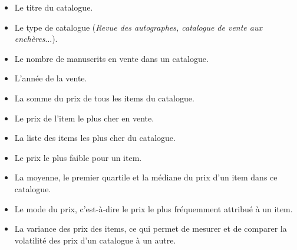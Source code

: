 \begin{itemize}
	\item Le titre du catalogue.
	\item Le type de catalogue (\textit{Revue des autographes, catalogue de vente aux enchères}...).
	\item Le nombre de manuscrits en vente dans un catalogue.
	\item L'année de la vente.
	\item La somme du prix de tous les items du catalogue.
	\item Le prix de l'item le plus cher en vente.
	\item La liste des items les plus cher du catalogue.
	\item Le prix le plus faible pour un item.
	\item La moyenne, le premier quartile et la médiane du prix d'un item dans ce catalogue.
	\item Le mode du prix, c'est-à-dire le prix le plus fréquemment attribué à un item.
	\item La variance des prix des items, ce qui permet de mesurer et de comparer la volatilité des prix d'un catalogue à un autre.
\end{itemize}

